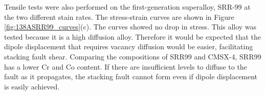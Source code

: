 \documentclass[a4paper,12pt,times,numbered,print,index]{Classes/PhDThesisPSnPDF}
\begin{document}
Tensile tests were also performed on the first-generation superalloy, SRR-99 at the two different stain rates. The stress-strain curves are shown in Figure \ref{fig:138ASRR99_curves}(c). The curves showed no drop in stress. This alloy was tested because it is a high diffusion alloy. Therefore it would be expected that the dipole displacement that requires vacancy diffusion would be easier, facilitating stacking fault shear. Comparing the compositions of SRR99 and CMSX-4, SRR99 has a lower Cr and Co content. If there are insufficient levels to diffuse to the fault as it propagates, the stacking fault cannot form even if dipole displacement is easily achieved.\\



\end{document}
